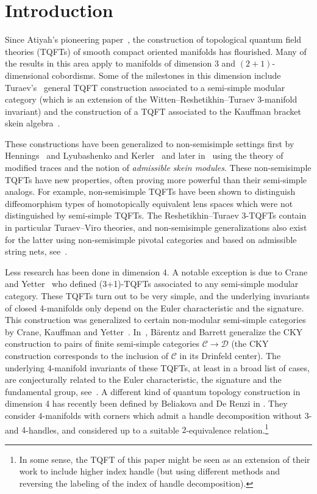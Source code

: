 \documentclass[pdftex]{sigma}
\numberwithin{equation}{section}
\numberwithin{theorem}{section}
\numberwithin{proposition}{section}
\numberwithin{definition}{section}
\numberwithin{lemma}{section}
\numberwithin{corollary}{section}
\numberwithin{remark}{section}
\numberwithin{example}{section}
\newcommand{\cat}{\mathcal{C}}
\newcommand{\catd}{\mathcal{D}}
\begin{document}


\section{Introduction}

Since Atiyah's pioneering paper~\cite{At}, the construction of topological quantum field theories (TQFTs) of smooth compact oriented manifolds has flourished. Many of the results in this area apply to
manifolds of dimension $3$ and $(2+1)$-dimensional cobordisms.
Some of the milestones in this dimension include Turaev's~\cite{Tu} general TQFT construction associated to a semi-simple modular category (which is an extension of the Witten--Reshetikhin--Turaev 3-manifold invariant) and the construction of a TQFT associated to the Kauffman bracket skein algebra~\cite{BHMV95}.

These constructions have been generalized to non-semisimple settings first by Hennings~\cite{H96} and Lyubashenko and Kerler~\cite{KerLy2001, L94} and later in~\cite{BCGP14,CGPV2023a,DRGGPMR2022} using the theory of modified traces and the notion of \emph{admissible skein modules}. These non-semisimple TQFTs have new properties, often proving more powerful than their semi-simple analogs. For example, non-semisimple TQFTs have
been
shown to distinguish diffeomorphism types of homotopically equivalent lens spaces which were not distinguished by semi-simple TQFTs.
The Reshetikhin--Turaev 3-TQFTs contain in particular Turaev--Viro theories, and non-semisimple
generalizations
also exist for the latter using non-semisimple pivotal categories and based on admissible string nets, see~\mbox{\cite{CGPV2023a, MSWY23}}.

Less research has been done in dimension $4$. A notable exception is due to Crane and Yetter~\cite{CY}
who defined (3+1)-TQFTs associated to any semi-simple modular category. These TQFTs turn out to be very simple, and the underlying invariants of closed 4-manifolds only depend on the Euler characteristic
and
the signature.
This construction was generalized to certain non-modular semi-simple categories by Crane, Kauffman and Yetter~\cite{CYK}. In~\cite{BB18}, B\"arentz and Barrett generalize the CKY construction to pairs of finite semi-simple categories $\cat \to \catd$ (the CKY construction corresponds to the inclusion of $\cat$ in its Drinfeld center). The underlying 4-manifold invariants of these TQFTs, at least in a broad list of cases, are conjecturally related to the Euler characteristic, the signature and the fundamental group, see~\cite[Conjecture~8.1]{BB18}.
A different kind of quantum topology construction in dimension 4 has
recently been defined by Beliakova and De Renzi in
\cite{BD22, BD21}.
They consider $4$-manifolds with corners which admit a handle decomposition without
$3$- and $4$-handles, and considered up to a suitable $2$-equivalence
relation.\footnote{In some sense, the TQFT of this paper might be seen as
 an extension of their work to include higher index handle (but using
 different methods and reversing the labeling of the index of handle decomposition).}
\end{document}
